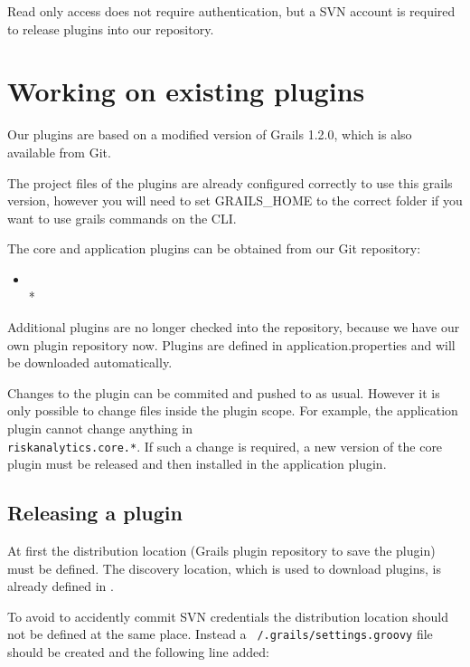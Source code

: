 Read only access does not require authentication, but a SVN account is required to release
plugins into our repository.


\chapter{Working on existing plugins}
\label{chap:devguide-plugins}

Our plugins are based on a modified version of Grails 1.2.0, which is also available from Git.

The project files of the plugins are already configured correctly to use this grails
version, however you will need to set GRAILS\_HOME to the correct folder if you want to use
grails commands on the CLI.

The core and application plugins can be obtained from our Git repository:
\begin{itemize}
	\item[]
		\\*
\end{itemize}


Additional plugins are no longer checked into the repository, because we have our own plugin
repository now.  Plugins are defined in application.properties and will be downloaded
automatically.

Changes to the plugin can be commited and pushed to  as usual. However it is only
possible to change files inside the plugin scope. For example, the application plugin cannot
change anything in \\ \texttt{riskanalytics.core.*}.  If such a change is required, a new
version of the core plugin must be released and then installed in the application plugin.

\section{Releasing a plugin}

At first the distribution location (Grails plugin repository to save the plugin) must be defined.
The discovery location, which is used to download plugins, is already defined in .

To avoid to accidently commit SVN credentials the distribution location should not be defined at the same place.
Instead a \texttt{~/.grails/settings.groovy} file should be created and the following line added:

